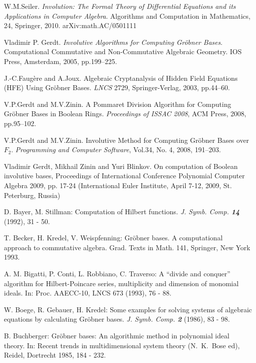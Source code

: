 \begin{thebibliography}{999}
 W.M.Seiler. \emph{Involution: The Formal Theory of Differential Equations and its Applications 
in Computer Algebra}. Algorithms and Computation in Mathematics, 24, Springer, 2010.  arXiv:math.AC/0501111

 Vladimir P. Gerdt. \emph{Involutive Algorithms for Computing Gr\"obner Bases}.
Computational Commutative and Non-Commutative Algebraic Geometry. IOS Press, Amsterdam, 2005, pp.199--225.

J.-C.Faug\`{e}re and A.Joux. Algebraic Cryptanalysis of Hidden Field Equations
(HFE) Using Gr\"obner Bases. \emph{LNCS} 2729, Springer-Verlag, 2003, pp.44--60.

V.P.Gerdt and M.V.Zinin. A Pommaret Division Algorithm for Computing Gr\"obner Bases in Boolean Rings.
\emph{Proceedings of ISSAC 2008}, ACM Press, 2008, pp.95--102.

V.P.Gerdt and M.V.Zinin. Involutive Method for Computing Gr\"obner Bases over $F_2$.
\emph{Programming and Computer Software}, Vol.34, No. 4, 2008, 191--203.

Vladimir Gerdt, Mikhail Zinin and Yuri Blinkov. On computation of Boolean involutive bases,
Proceedings of International Conference Polynomial Computer Algebra 2009, pp. 17-24
(International Euler Institute, April 7-12, 2009, St. Peterburg, Russia)


 D. Bayer, M. Stillman: Computation of Hilbert
functions. \textit{J. Symb. Comp. \textbf{14}} (1992), 31 - 50.

 T. Becker, H. Kredel, V. Weispfenning: Gr\"obner bases. A
computational approach to commutative algebra. Grad. Texts in Math.
141, Springer, New York 1993.

 A. M. Bigatti, P. Conti, L. Robbiano, C. Traverso: A
``divide and conquer'' algorithm for Hilbert-Poincare series,
multiplicity and dimension of monomial ideals. In: Proc. AAECC-10,
LNCS 673 (1993), 76 - 88.

 W. Boege, R. Gebauer, H. Kredel: Some examples for
solving systems of algebraic equations by calculating Gr\"obner bases. {\it
J. Symb. Comp. \textbf{2}} (1986), 83 - 98.

 B. Buchberger: Gr\"obner bases: An algorithmic method in
polynomial ideal theory. In: Recent trends in multidimensional
system theory (N.~K.~Bose ed), Reidel, Dortrecht 1985, 184 - 232.


\end{thebibliography}
